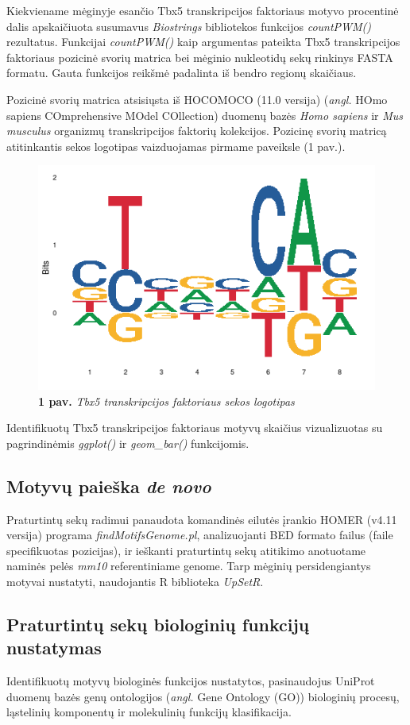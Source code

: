 \documentclass[12pt]{article}
\begin{document}
Kiekviename mėginyje esančio Tbx5 transkripcijos faktoriaus
motyvo procentinė dalis apskaičiuota susumavus \emph{Biostrings}\cite{BIOSTR}
bibliotekos funkcijos \emph{countPWM()} rezultatus. Funkcijai
\emph{countPWM()} kaip argumentas pateikta Tbx5 transkripcijos
faktoriaus pozicinė svorių matrica bei mėginio nukleotidų
sekų rinkinys FASTA formatu. Gauta funkcijos reikšmė padalinta
iš bendro regionų skaičiaus.

Pozicinė svorių matrica atsisiųsta iš HOCOMOCO\cite{HOCOMOCO} (11.0 versija)
(\emph{angl.} HOmo sapiens COmprehensive MOdel COllection)
duomenų bazės \emph{Homo sapiens} ir \emph{Mus musculus}
organizmų transkripcijos faktorių kolekcijos. Pozicinę svorių
matricą atitinkantis sekos logotipas vaizduojamas
pirmame paveiksle (1 pav.).

\begin{figure}[htb]
    \begin{center}
        \includegraphics[width=0.5\linewidth]{../Figures/tbx5_motif.png}
        \caption*{\textbf{1 pav.} \emph{Tbx5 transkripcijos faktoriaus
                                        sekos logotipas}}
    \end{center}
\end{figure}

Identifikuotų Tbx5 transkripcijos faktoriaus motyvų skaičius
vizualizuotas su pagrindinėmis \emph{ggplot()} ir \emph{geom\_bar()}
funkcijomis.

\subsection{Motyvų paieška \emph{de novo}}
Praturtintų sekų radimui panaudota komandinės eilutės įrankio
HOMER\cite{HOMER} (v4.11 versija) programa
\emph{findMotifsGenome.pl},
analizuojanti BED formato failus (faile specifikuotas
pozicijas), ir ieškanti praturtintų sekų atitikimo anotuotame
naminės pelės \emph{mm10} referentiniame genome.
Tarp mėginių persidengiantys motyvai nustatyti, naudojantis
R biblioteka \emph{UpSetR}\cite{UPSETR}.

\subsection{Praturtintų sekų biologinių funkcijų nustatymas}
Identifikuotų motyvų biologinės funkcijos nustatytos, pasinaudojus
UniProt\cite{UNIPROT} duomenų bazės genų ontologijos
(\emph{angl.} Gene Ontology (GO))
biologinių procesų, ląstelinių komponentų ir molekulinių funkcijų
klasifikacija.
\end{document}
